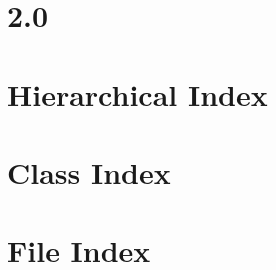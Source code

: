 \documentclass[twoside]{book}
\begin{document}
\chapter{2.0}
\label{md__sources__librairies__test_flight_s_d_k_release_notes}
\hypertarget{md__sources__librairies__test_flight_s_d_k_release_notes}{}

\chapter{Hierarchical Index}

\chapter{Class Index}

\chapter{File Index}

\end{document}
